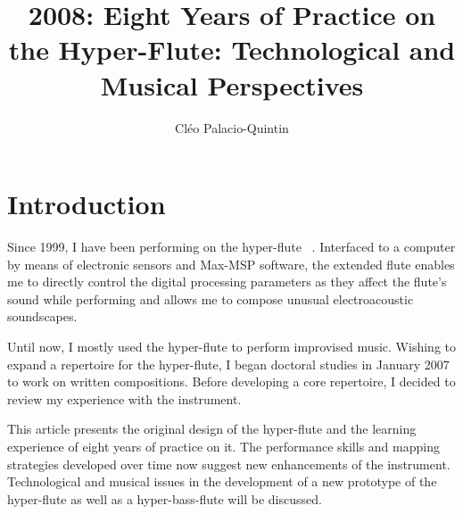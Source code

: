 
\graphicspath{ {mainmatter/Palacio-Quintin_2008/} }

\title*{2008: Eight Years of Practice on the Hyper-Flute: Technological and Musical Perspectives}
\author{Cl\'{e}o Palacio-Quintin}

\maketitle


\section{Introduction}

Since 1999, I have been performing on the hyper-flute~ \cite{Palacio-Quintin:2003}. Interfaced to a computer by means of electronic sensors and Max-MSP software, the extended flute enables me to directly control the digital processing parameters as they affect the flute's sound while performing and allows me to compose unusual electroacoustic soundscapes.

Until now, I mostly used the hyper-flute to perform improvised music.  Wishing to expand a repertoire for the hyper-flute, I began doctoral studies in January 2007 to work on written compositions. Before developing a core repertoire, I decided to review my experience with the instrument. 

This article presents the original design of the hyper-flute and the learning experience of eight years of practice on it. The performance skills and mapping strategies developed over time now suggest new enhancements of the instrument. Technological and musical issues in the development of a new prototype of the hyper-flute as well as a hyper-bass-flute will be discussed.


